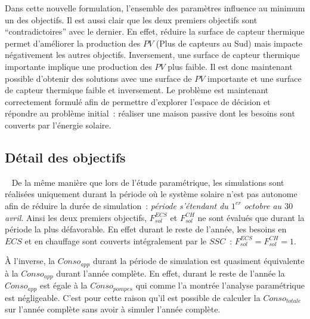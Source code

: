 Dans cette nouvelle formulation, l’ensemble des paramètres influence au minimum un des
objectifs. Il est aussi clair que les deux premiers objectifs sont \enquote{contradictoires} avec
le dernier. En effet, réduire la surface de capteur thermique permet d’améliorer la
production des $PV$ (Plus de capteurs au Sud) mais impacte négativement les autres
objectifs. Inversement, une surface de capteur thermique importante implique une
production des $PV$ plus faible. Il est donc maintenant possible d’obtenir des
solutions avec une surface de $PV$ importante et une surface de capteur thermique
faible et inversement.
Le problème est maintenant correctement formulé afin de permettre d’explorer l’espace de décision et
répondre au problème initial~: réaliser une maison passive dont les besoins sont couverts
par l’énergie solaire.

\subsection{Détail des objectifs} %
\label{sub:detail_des_objectifs}
~
De la même manière que lors de l’étude paramétrique, les simulations sont réalisées
uniquement durant la période où le système solaire n’est pas autonome afin de réduire la
durée de simulation~: \emph{période s’étendant du $1^{er}$ octobre au $30$ avril}. Ainsi
les deux premiers objectifs, $F_{sol}^{ECS}$ et $F_{sol}^{CH}$ ne sont évalués que durant
la période la plus défavorable. En effet durant le reste de l’année, les besoins en $ECS$
et en chauffage sont couverts intégralement par le $SSC$~: $F_{sol}^{ECS} = F_{sol}^{CH} = 1$.

À l’inverse, la $Conso_{app}$ durant la période de simulation est quasiment équivalente à
la $Conso_{app}$ durant l’année complète. En effet, durant le reste de l’année la
$Conso_{app}$ est égale à la $Conso_{pompes}$ qui comme l’a montrée l’analyse paramétrique
est négligeable. C’est pour cette raison qu’il est possible de calculer la
$Conso_{totale}$ sur l’année complète sans avoir à simuler l’année complète.

